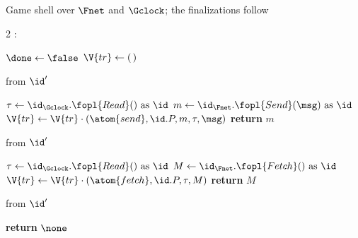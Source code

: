 \documentclass[10pt,oneside,openany]{book}
\theoremstyle{accentdef}
\theoremstyle{accentplain}
\begin{document}
\begin{interface}[nofloat]{Game shell over $\Fnet$ and $\Gclock$; the finalizations follow \\
}

{\scriptsize
\setlength{\columnsep}{1.4em}
\begin{multicols}{2}
:
\begin{algorithmic}[1]
\setcounter{contline}{0}\algcont
\State $\done \gets \false$
\State $\V{tr} \gets (\,)$
\algsave
\end{algorithmic}
\vspace{1.4ex}

 \quad from $\id'$
\begin{algorithmic}[1]
\algcont
\Req{$\neg\done$}
\State $\tau \gets \id_{\Gclock}.\fopl{Read}() \text{ as } \id$
\State $m \gets \id_{\Fnet}.\fopl{Send}(\msg) \text{ as } \id$ \label{ln:gnetsend}
\State $\V{tr} \gets \V{tr} \cdot (\atom{send},\id.P,m,\tau,\msg)$
\State \textbf{return} $m$
\algsave
\end{algorithmic}
\vspace{1.4ex}

\columnbreak

 \quad from $\id'$
\begin{algorithmic}[1]
\algcont
\Req{$\neg\done$}
\State $\tau \gets \id_{\Gclock}.\fopl{Read}() \text{ as } \id$
\State $M \gets \id_{\Fnet}.\fopl{Fetch}() \text{ as } \id$ \label{ln:gnetfetch}
\State $\V{tr} \gets \V{tr} \cdot (\atom{fetch},\id.P,\tau,M)$
\State \textbf{return} $M$
\algsave
\end{algorithmic}
\vspace{1.4ex}

 \quad from $\id'$
\begin{algorithmic}[1]
\algcont
\State \textbf{return} $\none$
\algsave
\end{algorithmic}
\vspace{1.4ex}

\end{multicols}}
\end{interface}
\end{document}

